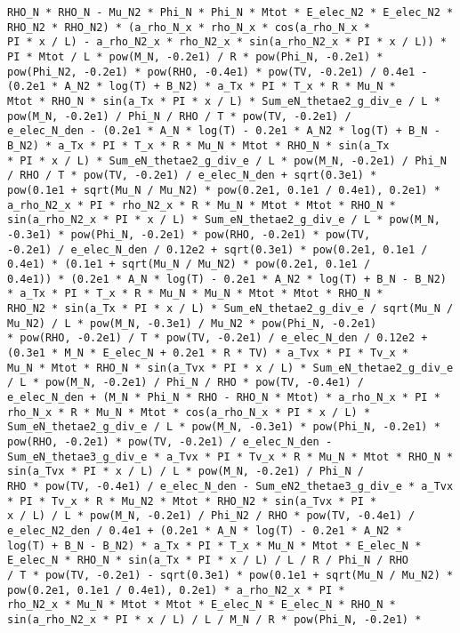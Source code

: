 \documentclass[10pt]{article}
\begin{document}
\begin{scriptsize}
\begin{verbatim}
RHO_N * RHO_N - Mu_N2 * Phi_N * Phi_N * Mtot * E_elec_N2 * E_elec_N2 * RHO_N2 * RHO_N2) * (a_rho_N_x * rho_N_x * cos(a_rho_N_x *
PI * x / L) - a_rho_N2_x * rho_N2_x * sin(a_rho_N2_x * PI * x / L)) * PI * Mtot / L * pow(M_N, -0.2e1) / R * pow(Phi_N, -0.2e1) *
pow(Phi_N2, -0.2e1) * pow(RHO, -0.4e1) * pow(TV, -0.2e1) / 0.4e1 - (0.2e1 * A_N2 * log(T) + B_N2) * a_Tx * PI * T_x * R * Mu_N *
Mtot * RHO_N * sin(a_Tx * PI * x / L) * Sum_eN_thetae2_g_div_e / L * pow(M_N, -0.2e1) / Phi_N / RHO / T * pow(TV, -0.2e1) /
e_elec_N_den - (0.2e1 * A_N * log(T) - 0.2e1 * A_N2 * log(T) + B_N - B_N2) * a_Tx * PI * T_x * R * Mu_N * Mtot * RHO_N * sin(a_Tx
* PI * x / L) * Sum_eN_thetae2_g_div_e / L * pow(M_N, -0.2e1) / Phi_N / RHO / T * pow(TV, -0.2e1) / e_elec_N_den + sqrt(0.3e1) *
pow(0.1e1 + sqrt(Mu_N / Mu_N2) * pow(0.2e1, 0.1e1 / 0.4e1), 0.2e1) * a_rho_N2_x * PI * rho_N2_x * R * Mu_N * Mtot * Mtot * RHO_N *
sin(a_rho_N2_x * PI * x / L) * Sum_eN_thetae2_g_div_e / L * pow(M_N, -0.3e1) * pow(Phi_N, -0.2e1) * pow(RHO, -0.2e1) * pow(TV,
-0.2e1) / e_elec_N_den / 0.12e2 + sqrt(0.3e1) * pow(0.2e1, 0.1e1 / 0.4e1) * (0.1e1 + sqrt(Mu_N / Mu_N2) * pow(0.2e1, 0.1e1 /
0.4e1)) * (0.2e1 * A_N * log(T) - 0.2e1 * A_N2 * log(T) + B_N - B_N2) * a_Tx * PI * T_x * R * Mu_N * Mu_N * Mtot * Mtot * RHO_N *
RHO_N2 * sin(a_Tx * PI * x / L) * Sum_eN_thetae2_g_div_e / sqrt(Mu_N / Mu_N2) / L * pow(M_N, -0.3e1) / Mu_N2 * pow(Phi_N, -0.2e1)
* pow(RHO, -0.2e1) / T * pow(TV, -0.2e1) / e_elec_N_den / 0.12e2 + (0.3e1 * M_N * E_elec_N + 0.2e1 * R * TV) * a_Tvx * PI * Tv_x *
Mu_N * Mtot * RHO_N * sin(a_Tvx * PI * x / L) * Sum_eN_thetae2_g_div_e / L * pow(M_N, -0.2e1) / Phi_N / RHO * pow(TV, -0.4e1) /
e_elec_N_den + (M_N * Phi_N * RHO - RHO_N * Mtot) * a_rho_N_x * PI * rho_N_x * R * Mu_N * Mtot * cos(a_rho_N_x * PI * x / L) *
Sum_eN_thetae2_g_div_e / L * pow(M_N, -0.3e1) * pow(Phi_N, -0.2e1) * pow(RHO, -0.2e1) * pow(TV, -0.2e1) / e_elec_N_den -
Sum_eN_thetae3_g_div_e * a_Tvx * PI * Tv_x * R * Mu_N * Mtot * RHO_N * sin(a_Tvx * PI * x / L) / L * pow(M_N, -0.2e1) / Phi_N /
RHO * pow(TV, -0.4e1) / e_elec_N_den - Sum_eN2_thetae3_g_div_e * a_Tvx * PI * Tv_x * R * Mu_N2 * Mtot * RHO_N2 * sin(a_Tvx * PI *
x / L) / L * pow(M_N, -0.2e1) / Phi_N2 / RHO * pow(TV, -0.4e1) / e_elec_N2_den / 0.4e1 + (0.2e1 * A_N * log(T) - 0.2e1 * A_N2 *
log(T) + B_N - B_N2) * a_Tx * PI * T_x * Mu_N * Mtot * E_elec_N * E_elec_N * RHO_N * sin(a_Tx * PI * x / L) / L / R / Phi_N / RHO
/ T * pow(TV, -0.2e1) - sqrt(0.3e1) * pow(0.1e1 + sqrt(Mu_N / Mu_N2) * pow(0.2e1, 0.1e1 / 0.4e1), 0.2e1) * a_rho_N2_x * PI *
rho_N2_x * Mu_N * Mtot * Mtot * E_elec_N * E_elec_N * RHO_N * sin(a_rho_N2_x * PI * x / L) / L / M_N / R * pow(Phi_N, -0.2e1) *

\end{verbatim}
\end{scriptsize}
\end{document}
